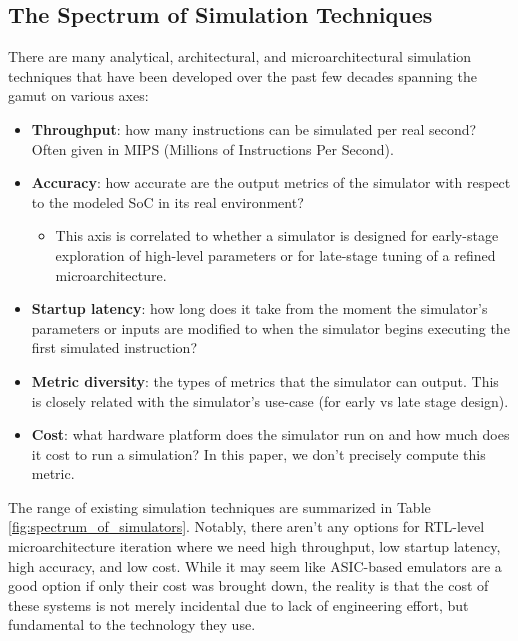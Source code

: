 \documentclass[sigplan,nonacm,10pt]{acmart}
\begin{document}
\subsection{The Spectrum of Simulation Techniques}

There are many analytical, architectural, and microarchitectural simulation techniques that have been developed over the past few decades spanning the gamut on various axes:

\begin{itemize}
  \item \textbf{Throughput}: how many instructions can be simulated per real second? Often given in MIPS (Millions of Instructions Per Second).
  \item \textbf{Accuracy}: how accurate are the output metrics of the simulator with respect to the modeled SoC in its real environment?
  \begin{itemize}
    \item This axis is correlated to whether a simulator is designed for early-stage exploration of high-level parameters or for late-stage tuning of a refined microarchitecture.
  \end{itemize}
  \item \textbf{Startup latency}: how long does it take from the moment the simulator's parameters or inputs are modified to when the simulator begins executing the first simulated instruction?
  \item \textbf{Metric diversity}: the types of metrics that the simulator can output. This is closely related with the simulator's use-case (for early vs late stage design).
  \item \textbf{Cost}: what hardware platform does the simulator run on and how much does it cost to run a simulation? In this paper, we don't precisely compute this metric.
\end{itemize}

The range of existing simulation techniques are summarized in Table \ref{fig:spectrum_of_simulators}.
Notably, there aren't any options for RTL-level microarchitecture iteration where we need high throughput, low startup latency, high accuracy, and low cost.
While it may seem like ASIC-based emulators are a good option if only their cost was brought down, the reality is that the cost of these systems is not merely incidental due to lack of engineering effort, but fundamental to the technology they use.
\end{document}
